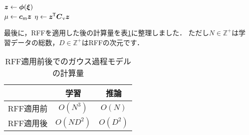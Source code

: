 \begin{algorithm}[t]
    \caption{}
    \label{alg:rffgp_infer}
    $\boldsymbol{z} \gets \boldsymbol{\phi}(\boldsymbol{\xi})$ \\
    $\mu \gets \boldsymbol{c}_\mathrm{m} \boldsymbol{z}$
    \hfill{}
    $\eta \gets \boldsymbol{z}^{\mkern-1.5mu\mathsf{T}} \boldsymbol{C}_\mathrm{v} \boldsymbol{z}$
    \hfill{}
\end{algorithm}

最後に，RFFを適用した後の計算量を表\ref{tab:gp_complexity}に整理しました．
ただし$N \in \mathbb{Z}^+$は学習データの総数，$D \in \mathbb{Z}^+$はRFFの次元です．

\begin{table}[t]
    \caption{RFF適用前後でのガウス過程モデルの計算量}
    \label{tab:gp_complexity}
    \begin{center}\begin{tabular}{ccc}
        \hline
         & 学習 & 推論 \\
        \hline
        RFF適用前 & $O(N^3)$   & $O(N)$    \\  
        RFF適用後 & $O(N D^2)$ & $O(D^2)$  \\
        \hline
    \end{tabular}\end{center}
\end{table}

